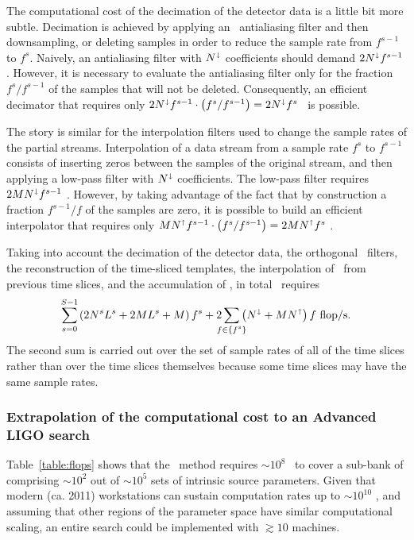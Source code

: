 The computational cost of the decimation of the detector data is a little bit more subtle.  Decimation is achieved by applying an \fir\ antialiasing filter and then downsampling, or deleting samples in order to reduce the sample rate from $f^{s-1}$ to $f^s$.  Naively, an antialiasing filter with $N^\shortdownarrow$ coefficients should demand $2 N^\shortdownarrow f^{s-1}$ \flops.  However, it is necessary to evaluate the antialiasing filter only for the fraction $f^s / f^{s-1}$ of the samples that will not be deleted.  Consequently, an efficient decimator that requires only $2 N^\shortdownarrow f^{s-1} \cdot \left( f^s / f^{s-1} \right) = 2 N^\shortdownarrow f^s$ \flops\ is possible.

The story is similar for the interpolation filters used to change the sample rates of the partial \SNR{} streams.  Interpolation of a data stream from a sample rate $f^s$ to $f^{s-1}$ consists of inserting zeros between the samples of the original stream, and then applying a low-pass filter with $N^\shortdownarrow$ coefficients.  The low-pass filter requires $2 M N^\shortdownarrow f^{s-1}$ \flops.  However, by taking advantage of the fact that by construction a fraction $f^{s-1}/f$ of the samples are zero, it is possible to build an efficient interpolator that requires only $M N^\shortuparrow f^{s-1} \cdot \left( f^s / f^{s-1} \right) = 2 M N^\shortuparrow f^s$ \flops.

Taking into account the decimation of the detector data, the orthogonal \fir\ filters, the reconstruction of the time-sliced templates, the interpolation of \SNR\ from previous time slices, and the accumulation of \SNR, in total \lloid\ requires
$$
\sum_{\mathclap{s=0}}^{\mathclap{S-1}} \left( 2 \slicessamps \numsvdtmps + 2 \numtmps \numsvdtmps + \numtmps \right) f^s + 2\sum_{\mathclap{f \in \{f^s\}}} \left( N^\shortdownarrow + \numtmps N^\shortuparrow \right) f \textrm{ \flops.}
$$
The second sum is carried out over the set of sample rates of all of the time slices rather than over the time slices themselves because some time slices may have the same sample rates.

\subsubsection{Extrapolation of the computational cost to an Advanced LIGO search}

Table~\ref{table:flops} shows that the \lloid\ method requires $\sim 10^8$ \flops\
to cover a sub-bank of comprising $\sim 10^2$ out of $\sim 10^5$ sets of intrinsic
source parameters.  Given that modern (ca. 2011) workstations can sustain
computation rates up to $\sim 10^{10}$ \flops{}, and assuming that other regions of the
parameter space have similar computational scaling, an entire search could be implemented
with $\gtrsim 10$ machines.

